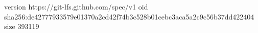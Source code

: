 version https://git-lfs.github.com/spec/v1
oid sha256:de42777933579e01370a2cd42f74b3c528b01cebc3aca5a2c9c56b37dd422404
size 393119
